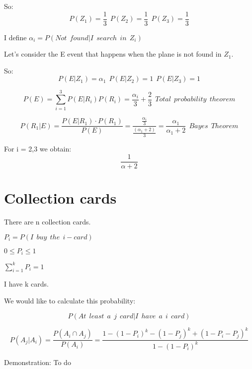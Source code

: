 \documentclass{article}
\begin{document}
\bigskip

So: $$P(Z_1) = \frac{1}{3} \ \ P(Z_2) = \frac{1}{3} \ \ P(Z_3) = \frac{1}{3}$$

\bigskip

I define $\alpha_i = P(Not \ \ found| I \ \ search \ \ in \ \ Z_i)$

\bigskip

Let's consider the E event that happens when the plane is not found in $Z_1$.

\bigskip

So: $$ P(E|Z_1) = \alpha_1 \ \ P(E|Z_2) = 1 \ \ P(E|Z_3) = 1$$ 


$$P(E) = \sum_{i=1}^3 P(E|R_i)P(R_i) = \frac{\alpha_i}{3} + \frac{2}{3} \ \ Total \ \ probability \ \ theorem$$

$$P(R_1|E) = \frac{P(E| R_1) \cdot P(R_1)}{P(E)} =  \frac{\frac{\alpha_i}{3}}{\frac{(\alpha_1 + 2)}{3}} = \frac{\alpha_1}{\alpha_1 + 2} \ \ Bayes \ \ Theorem$$

For i = 2,3 we obtain: $$\frac{1}{\alpha + 2}$$ 

\section{Collection cards}

There are n collection cards. 

$P_i = P(I \ \ buy \ \ the \ \ i-card)$

\bigskip

$0 \leq P_i \leq 1$

\bigskip

$\sum_{i=1}^k P_i = 1$

\bigskip

I have k cards.

We would like to calculate this probability:

$$P(At \ \ least \ \ a \ \ j \ \ card | I \ \ have \ \ a \ \ i \ \ card)$$

$$P(A_j | A_i ) = \frac{P(A_i \cap A_j)}{P(A_i)} = \frac{1 - (1 - P_i)^k - (1 - P_j)^k + (1 - P_i - P_j)^k}{1 - (1 - P_i)^k}$$

Demonstration: To do
\end{document}
